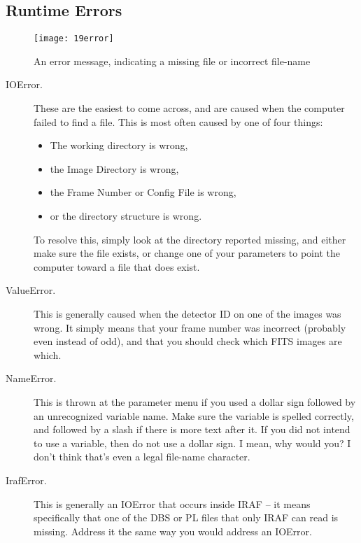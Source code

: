 \documentclass[10pt]{article}
\begin{document}
\subsection{Runtime Errors}

\begin{figure}
    \centering
    \texttt{[image: 19error]}
    \caption{An error message, indicating a missing file or incorrect file-name}
    \label{fig:error}
\end{figure}

\begin{description}

    \item[IOError.] These are the easiest to come across, and are caused when the computer failed to find a file. This is most often caused by one of four things:
    \begin{itemize}
        \item The working directory is wrong,
        \item the Image Directory is wrong,
        \item the Frame Number or Config File is wrong,
        \item or the directory structure is wrong.
    \end{itemize}
    To resolve this, simply look at the directory reported missing, and either make sure the file exists, or change one of your parameters to point the computer toward a file that does exist.
    
    \item[ValueError.] This is generally caused when the detector ID on one of the images was wrong. It simply means that your frame number was incorrect (probably even instead of odd), and that you should check which FITS images are which.
    
    \item[NameError.] This is thrown at the parameter menu if you used a dollar sign followed by an unrecognized variable name. Make sure the variable is spelled correctly, and followed by a slash if there is more text after it. If you did not intend to use a variable, then do not use a dollar sign. I mean, why would you? I don't think that's even a legal file-name character.
    
    \item[IrafError.] This is generally an IOError that occurs inside IRAF -- it means specifically that one of the DBS or PL files that only IRAF can read is missing. Address it the same way you would address an IOError.
    
\end{description}
\end{document}
